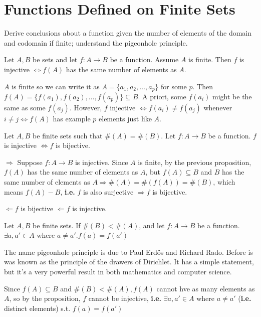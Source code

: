 \documentclass[10pt]{article}
\begin{document}
	\section{Functions Defined on Finite Sets}
	\begin{description}
		\item[Task:] Derive conclusions about a function given the number of elements of the domain and codomain if finite; understand the pigeonhole principle.
		\item[Proposition:] Let $A, B$ be sets and let $f:A \rightarrow B$ be a function. Assume $A$ is finite. Then $f$ is injective $\Leftrightarrow f(A)$ has the same number of elements as $A$.
		\item[Proof:]
		\item $A$ is finite so we can write it as $A = \{a_1, a_2, \dots, a_p\}$ for some $p$. Then $f(A) = \{f(a_1), f(a_2), \dots, f(a_p)\} \subseteq B$. A priori, some $f(a_i)$ might be the same as some $f(a_j)$. However, $f$ injective $\Leftrightarrow f(a_i) \neq f(a_j)$ whenever $i \neq j \Leftrightarrow f(A)$ has example $p$ elements just like $A$.
		\item[qed]
		\item[Corollary 1] Let $A, B$ be finite sets such that $\#(A) = \#(B)$. Let $f: A \rightarrow B$ be a function. $f$ is injective $\Leftrightarrow f$ is bijective.
		\item[Proof:]
		\item $\Rightarrow$ Suppose $f:A \rightarrow B$ is injective. Since $A$ is finite, by the previous proposition, $f(A)$ has the same number of elements as $A$, but $f(A) \subseteq B$ and $B$ has the same number of elements as $A \Rightarrow \#(A) = \#(f(A)) = \#(B)$, which means $f(A) - B$, \textbf{i.e.} $f$ is also surjective $\Rightarrow f$ is bijective.
		\item $\Leftarrow f$ is bijective $\Leftarrow f$ is injective.
		\item[qed]
		\item[Corollary 2 (The Pigeonhole Principle)] Let $A, B$ be finite sets. If $\#(B) < \#(A)$, and let $f:A \rightarrow B$ be a function. $\exists a, a' \in A$ where $ a \neq a'. f(a) = f(a')$
		\item[Remark:] The name pigeonhole principle is due to Paul Erd\"{o}s and Richard Rado. Before is was known as the principle of the drawers of Dirichlet. It has a simple statement, but it's a very powerful result in both mathematics and computer science.
		\item[Proof:] Since $f(A) \subseteq B$ and $\#(B) < \#(A), f(A)$ cannot hve as many elements as $A$, so by the proposition, $f$ cannot be injective, \textbf{i.e.} $\exists a, a' \in A$ where $a \neq a'$ (\textbf{i.e.} distinct elements) s.t. $f(a) = f(a')$

\end{description}
\end{document}
